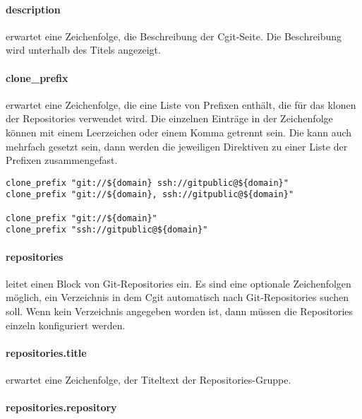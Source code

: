 \paragraph{description}

 erwartet eine Zeichenfolge, die Beschreibung der
Cgit-Seite. Die Beschreibung wird unterhalb des Titels angezeigt.

\paragraph{clone\_prefix}

 erwartet eine Zeichenfolge, die eine Liste von
Prefixen enthält, die für das klonen der Repositories verwendet wird. Die
einzelnen Einträge in der Zeichenfolge können mit einem Leerzeichen oder einem
Komma getrennt sein. Die  kann auch mehrfach gesetzt
sein, dann werden die jeweiligen Direktiven zu einer Liste der Prefixen
zusammengefast.

\begin{lstlisting}[style=Java, caption=Beispiele für die
\directive{clone\_prefix}]
clone_prefix "git://${domain} ssh://gitpublic@${domain}"
clone_prefix "git://${domain}, ssh://gitpublic@${domain}"

clone_prefix "git://${domain}"
clone_prefix "ssh://gitpublic@${domain}"
\end{lstlisting}

\paragraph{repositories}

 leitet einen Block von Git-Repositories ein. Es sind
eine optionale Zeichenfolgen möglich, ein Verzeichnis in dem Cgit automatisch
nach Git-Repositories suchen soll. Wenn kein Verzeichnis angegeben worden ist,
dann müssen die Repositories einzeln konfiguriert werden.

\paragraph{repositories.title}

 erwartet eine Zeichenfolge, der Titeltext der
Repositories-Gruppe.

\paragraph{repositories.repository}

